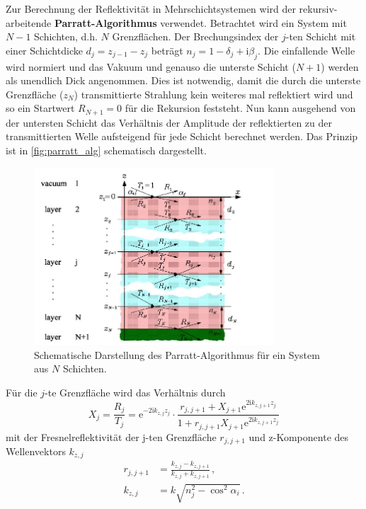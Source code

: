 Zur Berechnung der Reflektivität in Mehrschichtsystemen wird der rekursiv-arbeitende \textbf{Parratt-Algorithmus} verwendet.
Betrachtet wird ein System mit $N-1$ Schichten, d.h. $N$ Grenzflächen.
Der Brechungsindex der $j$-ten Schicht mit einer Schichtdicke $d_j = z_{j-1} - z_j$ beträgt $n_j = 1 - \delta_j + \mathrm{i} \beta_j$.
Die einfallende Welle wird normiert und das Vakuum und genauso die unterste Schicht ($N+1$) werden als unendlich Dick angenommen.
Dies ist notwendig, damit die durch die unterste Grenzfläche ($z_N$) transmittierte Strahlung kein weiteres mal reflektiert wird und so ein Startwert $R_{N+1} = 0$ für die Rekursion feststeht.
Nun kann ausgehend von der untersten Schicht das Verhältnis der Amplitude der reflektierten zu der transmittierten Welle aufsteigend für jede Schicht berechnet werden.
Das Prinzip ist in \autoref{fig:parratt_alg} schematisch dargestellt.
\begin{figure}
    \centering
    \includegraphics[width=0.8\textwidth]{content/data/parratt_algorithmus.jpg}
    \caption{Schematische Darstellung des Parratt-Algorithmus für ein System aus $N$ Schichten.\cite[10]{alte_anleitung}}
    \label{fig:parratt_alg}
\end{figure}
Für die $j$-te Grenzfläche wird das Verhältnis durch
\begin{equation}
    X_j = \frac{R_j}{T_j} = \mathrm{e}^{-2\mathrm{i} k_{z,j} z_j} \cdot \frac{r_{j,j+1} + X_{j+1} \mathrm{e}^{2\mathrm{i} k_{z,j+1} z_j}}{1 + r_{j,j+1} X_{j+1} \mathrm{e}^{2\mathrm{i} k_{z,j+1} z_j}}
    \label{eqn:parratt_alg}
\end{equation}
mit der Fresnelreflektivität der j-ten Grenzfläche $r_{j,j+1}$ und z-Komponente des Wellenvektors $k_{z,j}$
\begin{align*}
    r_{j,j+1} &= \frac{k_{z,j} - k_{z,j+1}}{k_{z,j} + k_{z,j+1}} \, ,\\
    k_{z,j} &= k \sqrt{ n_j^2 - \cos^2 \alpha_i} \, .
\end{align*}
\FloatBarrier

